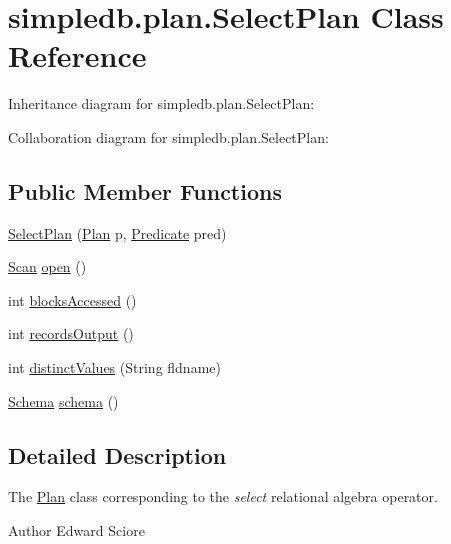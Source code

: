 \hypertarget{classsimpledb_1_1plan_1_1SelectPlan}{}\section{simpledb.\+plan.\+Select\+Plan Class Reference}
\label{classsimpledb_1_1plan_1_1SelectPlan}


Inheritance diagram for simpledb.\+plan.\+Select\+Plan\+:


Collaboration diagram for simpledb.\+plan.\+Select\+Plan\+:
\subsection*{Public Member Functions}
\begin{DoxyCompactItemize}
\item 
\hyperlink{classsimpledb_1_1plan_1_1SelectPlan_a9a68f7746d59d465befeda13b3f759fc}{Select\+Plan} (\hyperlink{interfacesimpledb_1_1plan_1_1Plan}{Plan} p, \hyperlink{classsimpledb_1_1query_1_1Predicate}{Predicate} pred)
\item 
\hyperlink{interfacesimpledb_1_1query_1_1Scan}{Scan} \hyperlink{classsimpledb_1_1plan_1_1SelectPlan_aa18edd10f7bac870ffd458c8da82c5f1}{open} ()
\item 
int \hyperlink{classsimpledb_1_1plan_1_1SelectPlan_aac8710bb3dcdab26ccd276ccb19f95cb}{blocks\+Accessed} ()
\item 
int \hyperlink{classsimpledb_1_1plan_1_1SelectPlan_af68bc517292c7bd5706b191f30124a2e}{records\+Output} ()
\item 
int \hyperlink{classsimpledb_1_1plan_1_1SelectPlan_ac7c325819656fe5de7a5b4b88ced3bc7}{distinct\+Values} (String fldname)
\item 
\hyperlink{classsimpledb_1_1record_1_1Schema}{Schema} \hyperlink{classsimpledb_1_1plan_1_1SelectPlan_a74090f0d52af6e4f8d5fe925fac3cb4c}{schema} ()
\end{DoxyCompactItemize}


\subsection{Detailed Description}
The \hyperlink{interfacesimpledb_1_1plan_1_1Plan}{Plan} class corresponding to the {\itshape select} relational algebra operator. \begin{DoxyAuthor}{Author}
Edward Sciore 
\end{DoxyAuthor}


